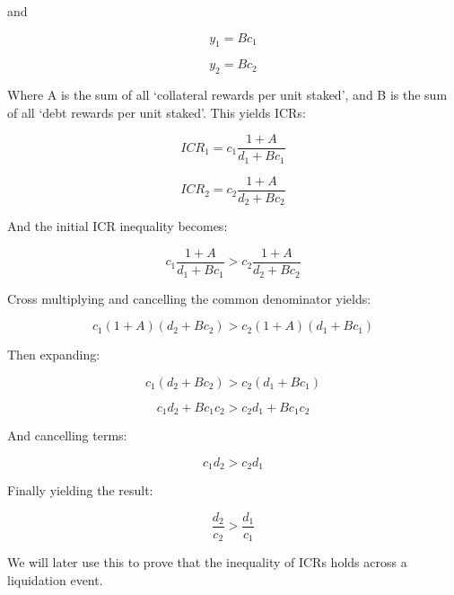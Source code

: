 \documentclass[reqno]{article}
\begin{document}
and

\begin{equation} 
    y_1=Bc_1
\end{equation}

\begin{equation} 
    y_2=Bc_2
\end{equation}

\bigskip
Where A is the sum of all ‘collateral rewards per unit staked’, and B is the sum of all ‘debt rewards per unit staked’. This yields ICRs:

\begin{equation} 
    ICR_1=c_1\frac{1+A}{d_1+Bc_1}
\end{equation}

\begin{equation} 
    ICR_2=c_2\frac{1+A}{d_2+Bc_2}
\end{equation}

And the initial ICR inequality becomes:

\begin{equation} 
    c_1\frac{1+A}{d_1+Bc_1}>c_2\frac{1+A}{d_2+Bc_2}
\end{equation}

\bigskip
Cross multiplying and cancelling the common denominator yields:

\begin{equation} 
    c_1\left(1+A\right)\left(d_2+Bc_2\right)>c_2\left(1+A\right)\left(d_1+Bc_1\right)
\end{equation}

Then expanding:

\begin{equation} 
    c_1\left(d_2+Bc_2\right)>c_2\left(d_1+Bc_1\right)
\end{equation}

\begin{equation} 
    c_1d_2+Bc_1c_2 > c_2d_1+Bc_1c_2
\end{equation}

\bigskip
And cancelling terms:

\begin{equation}
    c_1d_2 > c_2d_1
\end{equation}

\bigskip
Finally yielding the result:

\begin{equation} \label{eq:217}
    \frac{d_2}{c_2}>\frac{d_1}{c_1}
\end{equation}

\bigskip
We will later use this to prove that the inequality of ICRs holds across a liquidation event.\\
\end{document}
